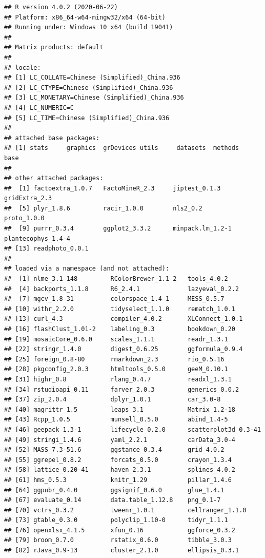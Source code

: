 \documentclass[
]{krantz}
\begin{document}
\begin{verbatim}
## R version 4.0.2 (2020-06-22)
## Platform: x86_64-w64-mingw32/x64 (64-bit)
## Running under: Windows 10 x64 (build 19041)
## 
## Matrix products: default
## 
## locale:
## [1] LC_COLLATE=Chinese (Simplified)_China.936 
## [2] LC_CTYPE=Chinese (Simplified)_China.936   
## [3] LC_MONETARY=Chinese (Simplified)_China.936
## [4] LC_NUMERIC=C                              
## [5] LC_TIME=Chinese (Simplified)_China.936    
## 
## attached base packages:
## [1] stats     graphics  grDevices utils     datasets  methods   base     
## 
## other attached packages:
##  [1] factoextra_1.0.7   FactoMineR_2.3     jiptest_0.1.3      gridExtra_2.3     
##  [5] plyr_1.8.6         racir_1.0.0        nls2_0.2           proto_1.0.0       
##  [9] purrr_0.3.4        ggplot2_3.3.2      minpack.lm_1.2-1   plantecophys_1.4-4
## [13] readphoto_0.0.1   
## 
## loaded via a namespace (and not attached):
##  [1] nlme_3.1-148         RColorBrewer_1.1-2   tools_4.0.2         
##  [4] backports_1.1.8      R6_2.4.1             lazyeval_0.2.2      
##  [7] mgcv_1.8-31          colorspace_1.4-1     MESS_0.5.7          
## [10] withr_2.2.0          tidyselect_1.1.0     rematch_1.0.1       
## [13] curl_4.3             compiler_4.0.2       XLConnect_1.0.1     
## [16] flashClust_1.01-2    labeling_0.3         bookdown_0.20       
## [19] mosaicCore_0.6.0     scales_1.1.1         readr_1.3.1         
## [22] stringr_1.4.0        digest_0.6.25        ggformula_0.9.4     
## [25] foreign_0.8-80       rmarkdown_2.3        rio_0.5.16          
## [28] pkgconfig_2.0.3      htmltools_0.5.0      geeM_0.10.1         
## [31] highr_0.8            rlang_0.4.7          readxl_1.3.1        
## [34] rstudioapi_0.11      farver_2.0.3         generics_0.0.2      
## [37] zip_2.0.4            dplyr_1.0.1          car_3.0-8           
## [40] magrittr_1.5         leaps_3.1            Matrix_1.2-18       
## [43] Rcpp_1.0.5           munsell_0.5.0        abind_1.4-5         
## [46] geepack_1.3-1        lifecycle_0.2.0      scatterplot3d_0.3-41
## [49] stringi_1.4.6        yaml_2.2.1           carData_3.0-4       
## [52] MASS_7.3-51.6        ggstance_0.3.4       grid_4.0.2          
## [55] ggrepel_0.8.2        forcats_0.5.0        crayon_1.3.4        
## [58] lattice_0.20-41      haven_2.3.1          splines_4.0.2       
## [61] hms_0.5.3            knitr_1.29           pillar_1.4.6        
## [64] ggpubr_0.4.0         ggsignif_0.6.0       glue_1.4.1          
## [67] evaluate_0.14        data.table_1.12.8    png_0.1-7           
## [70] vctrs_0.3.2          tweenr_1.0.1         cellranger_1.1.0    
## [73] gtable_0.3.0         polyclip_1.10-0      tidyr_1.1.1         
## [76] openxlsx_4.1.5       xfun_0.16            ggforce_0.3.2       
## [79] broom_0.7.0          rstatix_0.6.0        tibble_3.0.3        
## [82] rJava_0.9-13         cluster_2.1.0        ellipsis_0.3.1
\end{verbatim}

\cleardoublepage

  

\backmatter
\printindex
\end{document}
